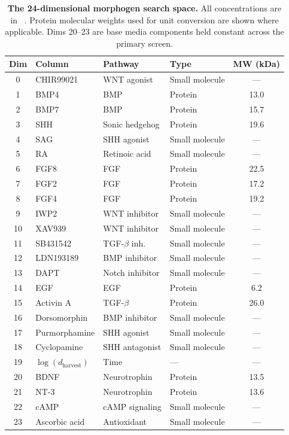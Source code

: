\documentclass[times,twoside]{zHenriquesLab-StyleBioRxiv}
\begin{document}
\begin{table}[tbp]
\centering
\caption{\textbf{The 24-dimensional morphogen search space.} All concentrations are in \si{\micro\Molar}. Protein molecular weights used for unit conversion are shown where applicable. Dims 20--23 are base media components held constant across the primary screen.}\label{tab:morphogens}
\small
\begin{tabular}{@{}clllc@{}}
\toprule
\textbf{Dim} & \textbf{Column} & \textbf{Pathway} & \textbf{Type} & \textbf{MW (kDa)} \\
\midrule
0  & CHIR99021  & WNT agonist      & Small molecule & --- \\
1  & BMP4       & BMP              & Protein        & 13.0 \\
2  & BMP7       & BMP              & Protein        & 15.7 \\
3  & SHH        & Sonic hedgehog   & Protein        & 19.6 \\
4  & SAG        & SHH agonist      & Small molecule & --- \\
5  & RA         & Retinoic acid    & Small molecule & --- \\
6  & FGF8       & FGF              & Protein        & 22.5 \\
7  & FGF2       & FGF              & Protein        & 17.2 \\
8  & FGF4       & FGF              & Protein        & 19.2 \\
9  & IWP2       & WNT inhibitor    & Small molecule & --- \\
10 & XAV939     & WNT inhibitor    & Small molecule & --- \\
11 & SB431542   & TGF-$\beta$ inh. & Small molecule & --- \\
12 & LDN193189  & BMP inhibitor    & Small molecule & --- \\
13 & DAPT       & Notch inhibitor  & Small molecule & --- \\
14 & EGF        & EGF              & Protein        & 6.2 \\
15 & Activin A  & TGF-$\beta$      & Protein        & 26.0 \\
16 & Dorsomorphin & BMP inhibitor  & Small molecule & --- \\
17 & Purmorphamine & SHH agonist   & Small molecule & --- \\
18 & Cyclopamine & SHH antagonist  & Small molecule & --- \\
19 & $\log(d_\text{harvest})$ & Time & --- & --- \\
20 & BDNF       & Neurotrophin     & Protein        & 13.5 \\
21 & NT-3       & Neurotrophin     & Protein        & 13.6 \\
22 & cAMP       & cAMP signaling   & Small molecule & --- \\
23 & Ascorbic acid & Antioxidant   & Small molecule & --- \\
\bottomrule
\end{tabular}
\end{table}
\end{document}
